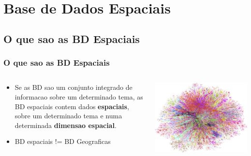 \documentclass[hyperref={pdfpagelabels=true}]{beamer}
\begin{document}
\section{Base de Dados Espaciais}

\subsection{O que sao as BD Espaciais} 
\begin{frame}
\frametitle{O que sao as BD Espaciais}
\begin{columns}
  \begin{column}{7cm}
    \begin{itemize}
      \item<1-> Se as BD sao um conjunto integrado de informacao sobre um determinado tema, as BD espaciais contem dados \textbf{espaciais}, sobre um determinado tema e numa determinada \textbf{dimensao espacial}.
      \item<2-> BD espaciais != BD Geograficas
      \end{itemize}
  \end{column}
  \begin{column}{10cm}
    \includegraphics[scale=0.4]{wired.png}
  \end{column}  
\end{columns}
\end{frame}
\end{document}
